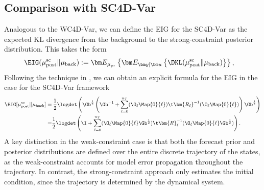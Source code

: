 \documentclass{aims} %
\theoremstyle{definition}
\begin{document}
\subsection{Comparison with SC4D-Var}\label{ssec:comparison}
%
Analogous to the WC4D-Var, we can define the EIG for the SC4D-Var as the expected KL divergence from the background to the strong-constraint posterior distribution. This takes the form  
\begin{align}\label{eqn:eigdef}
\begin{aligned}
 \EIG(\mu_{\text{post}}^{\rm sc} \| \mu_{\text{back}})&:=
  \bm E_{\mu_{\text{pr}}} \left\{   \bm E_{\bm y|\bm u} \left\{  \DKL (\mu_{\text{post}}^{\rm sc} \| \mu_{\text{back}})\right\} \right\},
 \end{aligned}
\end{align}
Following the technique in \cite[Section 4]{Alen}, we can obtain an explicit formula for the EIG in the case  for the SC4D-Var framework
\begin{align}
\EIG[\mu_{\rm post}^{\rm sc} || \mu_{\rm back}]=& \> \frac{1}{2}  
\logdet\left(  \Gb^{\frac 12} \left( {\Gb^{-1}}  
+ \sum_{\ell = 0}^{n_T}
  (\O_\ell \Map{0}{{\ell}})\t 
  \bm{R_\ell}^{-1}
  (\O_\ell \Map{0}{{\ell}})\right) {\Gb^{\frac 12}} \right) \nonumber
  \\  = & \frac{1}{2}\logdet\left(  \I +     
\sum_{\ell = 0}^{n_T}
  (\O_\ell \Map{0}{\ell} \Gb^{\frac 12})\t 
  \bm{R}_\ell^{-1}
  (\O_\ell \Map{0}{\ell}\Gb^{\frac 12})\right)  . \label{eq:DOpt_SC}
\end{align}
A key distinction in the weak-constraint case is that both the forecast prior and posterior distributions are defined over the entire discrete trajectory of the states, as the weak-constraint accounts for model error propagation throughout the trajectory. In contrast, the strong-constraint approach only estimates the initial condition, since the trajectory is determined by the dynamical system.
\end{document}
